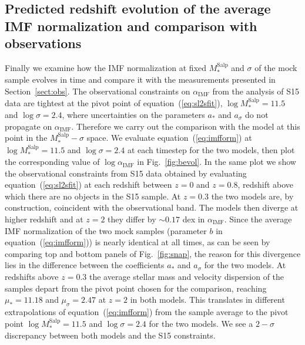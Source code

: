 \documentclass[usenatbib]{mnras}
\def\msalp{M_*^{\mathrm{Salp}}}
\def\aimf{\alpha_{\mathrm{IMF}}}
\def\Sref#1{Section~\ref{#1}\xspace}
\def\Fref#1{Fig.~\ref{#1}\xspace}
\def\Eref#1{equation~(\ref{#1})\xspace}
\begin{document}
 


\subsection{Predicted redshift evolution of the average IMF normalization and comparison with observations}


Finally we examine how the IMF normalization at fixed $\msalp$ and
$\sigma$ of the mock sample evolves in time and compare it with the
measurements presented in \Sref{sect:obs}.  The observational
constraints on $\aimf$ from the analysis of S15 data are tightest at
the pivot point of \Eref{eq:sl2sfit}, $\log{\msalp} = 11.5$ and
$\log{\sigma} = 2.4$, where uncertainties on the parameters $a_*$ and $a_\sigma$ do not propagate on $\aimf$. Therefore we carry out the comparison with the
model at this point in the $\msalp-\sigma$ space.  We evaluate
\Eref{eq:imfform} at $\log{\msalp} = 11.5$ and $\log{\sigma} = 2.4$ at
each timestep for the two models, then plot the corresponding value of
$\log{\aimf}$ in \Fref{fig:bevol}.  In the same plot we show the
observational constraints from S15 data obtained by evaluating
\Eref{eq:sl2sfit} at each redshift between $z=0$ and $z=0.8$, redshift
above which there are no objects in the S15 sample.  At $z=0.3$ the
two models are, by construction, coincident with the observational
band. The models then diverge at higher redshift and at $z=2$ they
differ by $\sim 0.17$ dex in $\aimf$.  
%
Since the average IMF
normalization of the two mock samples (parameter $b$ in
\Eref{eq:imfform}) is nearly identical at all times, as can be seen by
comparing top and bottom panels of \Fref{fig:snap}, the reason for this divergence lies in the difference
between the coefficients $a_*$ and $a_\sigma$ for the two models.  At
redshifts above $z=0.3$ the average stellar mass and velocity
dispersion of the samples depart from the pivot point chosen for the
comparison, reaching $\mu_*=11.18$ and $\mu_\sigma=2.47$ at $z=2$ in both models.  This translates in different
extrapolations of \Eref{eq:imfform} from the sample average to the
pivot point $\log{\msalp}=11.5$ and $\log{\sigma}=2.4$ for the two
models.  We see a $2-\sigma$ discrepancy between both models and the
S15 constraints. 
\end{document}
